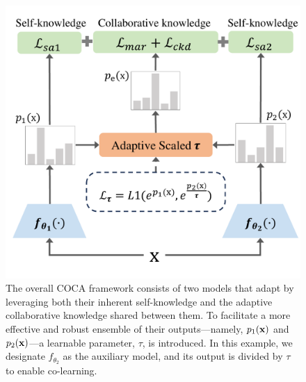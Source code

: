 \begin{figure}[t]
\centering
    \includegraphics[width=0.93\linewidth]{sec/overview_3.7.pdf}
    \caption{The overall COCA framework consists of two models that adapt by leveraging both their inherent self-knowledge and the adaptive collaborative knowledge shared between them. To facilitate a more effective and robust ensemble of their outputs—namely, $p_1(\mathbf{x})$ and $p_2(\mathbf{x})$—a learnable parameter, $\tau$, is introduced. In this example, we designate $f_{\theta_2}$ as the auxiliary model, and its output is divided by $\tau$ to enable co-learning.}
    \vspace{-0.15in}
\label{overview}
\end{figure}




